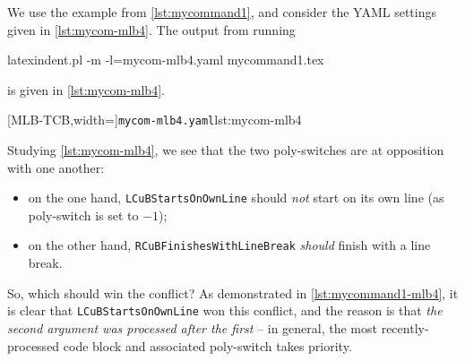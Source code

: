 \documentclass[10pt]{article}
\begin{document}
 \begin{example}
 We use the example from \vref{lst:mycommand1}, and consider the YAML settings given in
 \cref{lst:mycom-mlb4}. The output from running   

 \begin{commandshell}
latexindent.pl -m -l=mycom-mlb4.yaml mycommand1.tex
\end{commandshell}

 is given in \cref{lst:mycom-mlb4}.

 \begin{cmhtcbraster}
  [MLB-TCB,width=\linewidth]{\texttt{mycom-mlb4.yaml}}{lst:mycom-mlb4}
 \end{cmhtcbraster}

 Studying \cref{lst:mycom-mlb4}, we see that the two poly-switches are at opposition with
 one another:
 \begin{itemize}
  \item on the one hand, \texttt{LCuBStartsOnOwnLine} should \emph{not} start on its own
        line (as poly-switch is set to $-1$);
  \item on the other hand, \texttt{RCuBFinishesWithLineBreak} \emph{should} finish with a
        line break.
 \end{itemize}
 So, which should win the conflict? As demonstrated in \cref{lst:mycommand1-mlb4}, it is
 clear that \texttt{LCuBStartsOnOwnLine} won this conflict, and the reason is that
 \emph{the second argument was processed after the first} -- in general, the most
 recently-processed code block and associated poly-switch takes priority.
 \end{example}
\end{document}
